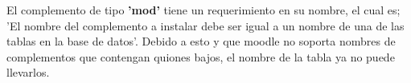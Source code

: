 El complemento de tipo  \textbf{'mod'} tiene un requerimiento en su nombre, el cual es; 'El nombre del complemento a instalar debe ser igual a un nombre
de una de las tablas en la base de datos'. Debido a esto y que moodle no soporta nombres de complementos que contengan quiones bajos, el
nombre de la tabla ya no puede llevarlos.\\




